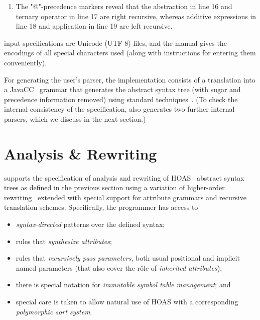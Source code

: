 \documentclass[letterpaper]{llncs}
\begin{document}
\begin{example}
\begin{enumerate}
  \item The "@"-precedence markers reveal that the abstraction in line 16 and ternary operator in
    line 17 are right recursive, whereas additive expressions in line 18 and application in line 19
    are left recursive.

  \end{enumerate}
  \HAX input specifications are Unicode (UTF-8) files, and the manual gives the encodings of all
  special characters used (along with instructions for entering them conveniently).
\end{example}

For generating the user's parser, the implementation consists of a translation into a
JavaCC~\cite{JavaCC} grammar that generates the abstract syntax tree (with sugar and precedence
information removed) using standard techniques~\cite{Aho+:2006}. (To check the internal consistency
of the specification, \HAX also generates two further internal parsers, which we discuss in the next
section.)


\section{Analysis \& Rewriting}
\label{sec:analysis}

\HAX supports the specification of analysis and rewriting of HOAS~\cite{PfenningElliot:pldi1988}
abstract syntax trees as defined in the previous section using a variation of higher-order
rewriting~\cite{Jouannaud:klop2005} extended with special support for attribute grammars and
recursive translation schemes.  Specifically, the programmer has access to
\begin{itemize}

\item \emph{syntax-directed} patterns over the defined syntax;

\item rules that \emph{synthesize attributes};

\item rules that \emph{recursively pass parameters}, both usual positional and implicit named
  parameters (that also cover the rôle of \emph{inherited attributes});

\item there is special notation for \emph{immutable symbol table management}; and

\item special care is taken to allow natural use of HOAS with a corresponding \emph{polymorphic sort
    system}.

\end{itemize}
\end{document}
